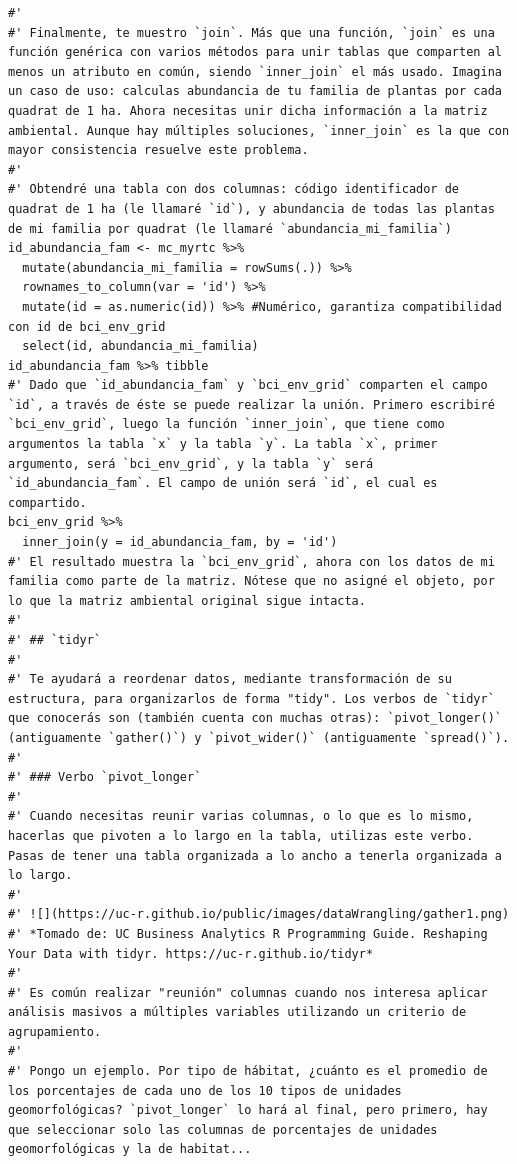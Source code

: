 \documentclass[11pt,]{article}
\begin{document}
\begin{verbatim}
#' 
#' Finalmente, te muestro `join`. Más que una función, `join` es una función genérica con varios métodos para unir tablas que comparten al menos un atributo en común, siendo `inner_join` el más usado. Imagina un caso de uso: calculas abundancia de tu familia de plantas por cada quadrat de 1 ha. Ahora necesitas unir dicha información a la matriz ambiental. Aunque hay múltiples soluciones, `inner_join` es la que con mayor consistencia resuelve este problema.
#' 
#' Obtendré una tabla con dos columnas: código identificador de quadrat de 1 ha (le llamaré `id`), y abundancia de todas las plantas de mi familia por quadrat (le llamaré `abundancia_mi_familia`)
id_abundancia_fam <- mc_myrtc %>%
  mutate(abundancia_mi_familia = rowSums(.)) %>% 
  rownames_to_column(var = 'id') %>%
  mutate(id = as.numeric(id)) %>% #Numérico, garantiza compatibilidad con id de bci_env_grid
  select(id, abundancia_mi_familia)
id_abundancia_fam %>% tibble
#' Dado que `id_abundancia_fam` y `bci_env_grid` comparten el campo `id`, a través de éste se puede realizar la unión. Primero escribiré `bci_env_grid`, luego la función `inner_join`, que tiene como argumentos la tabla `x` y la tabla `y`. La tabla `x`, primer argumento, será `bci_env_grid`, y la tabla `y` será `id_abundancia_fam`. El campo de unión será `id`, el cual es compartido.
bci_env_grid %>%
  inner_join(y = id_abundancia_fam, by = 'id')
#' El resultado muestra la `bci_env_grid`, ahora con los datos de mi familia como parte de la matriz. Nótese que no asigné el objeto, por lo que la matriz ambiental original sigue intacta.
#' 
#' ## `tidyr`
#' 
#' Te ayudará a reordenar datos, mediante transformación de su estructura, para organizarlos de forma "tidy". Los verbos de `tidyr` que conocerás son (también cuenta con muchas otras): `pivot_longer()` (antiguamente `gather()`) y `pivot_wider()` (antiguamente `spread()`).
#' 
#' ### Verbo `pivot_longer`
#' 
#' Cuando necesitas reunir varias columnas, o lo que es lo mismo, hacerlas que pivoten a lo largo en la tabla, utilizas este verbo. Pasas de tener una tabla organizada a lo ancho a tenerla organizada a lo largo.
#' 
#' ![](https://uc-r.github.io/public/images/dataWrangling/gather1.png)
#' *Tomado de: UC Business Analytics R Programming Guide. Reshaping Your Data with tidyr. https://uc-r.github.io/tidyr*
#' 
#' Es común realizar "reunión" columnas cuando nos interesa aplicar análisis masivos a múltiples variables utilizando un criterio de agrupamiento. 
#' 
#' Pongo un ejemplo. Por tipo de hábitat, ¿cuánto es el promedio de los porcentajes de cada uno de los 10 tipos de unidades geomorfológicas? `pivot_longer` lo hará al final, pero primero, hay que seleccionar solo las columnas de porcentajes de unidades geomorfológicas y la de habitat...

\end{verbatim}
\end{document}
